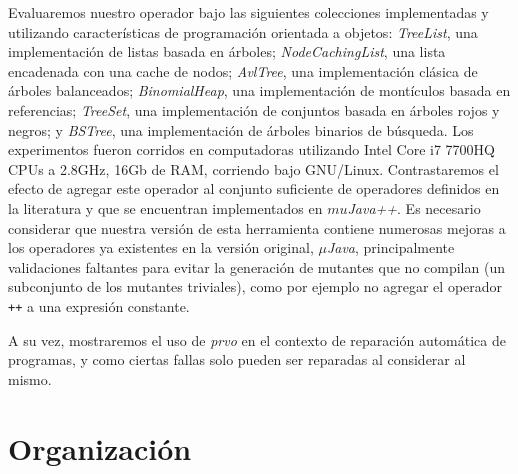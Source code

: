 Evaluaremos nuestro operador bajo las siguientes colecciones implementadas y utilizando caracter\'isticas de programaci\'on orientada a objetos: \emph{TreeList}, una implementaci\'on de listas basada en \'arboles; \emph{NodeCachingList}, una lista encadenada con una cache de nodos; \emph{AvlTree}, una implementaci\'on cl\'asica de \'arboles balanceados; \emph{BinomialHeap}, una implementaci\'on de mont\'iculos basada en referencias; \emph{TreeSet}, una implementaci\'on de conjuntos basada en \'arboles rojos y negros; y \emph{BSTree}, una implementaci\'on de \'arboles binarios de b\'usqueda. Los experimentos fueron corridos en computadoras utilizando Intel Core i7 7700HQ CPUs a 2.8GHz, 16Gb de RAM, corriendo bajo GNU/Linux. Contrastaremos el efecto de agregar este operador al conjunto suficiente de operadores definidos en la literatura y que se encuentran implementados en \emph{$mu$Java++}. Es necesario considerar que nuestra versi\'on de esta herramienta contiene numerosas mejoras a los operadores ya existentes en la versi\'on original, \emph{$\mu$Java}, principalmente validaciones faltantes para evitar la generaci\'on de mutantes que no compilan (un subconjunto de los mutantes triviales), como por ejemplo no agregar el operador \texttt{++} a una expresi\'on constante.

A su vez, mostraremos el uso de \emph{prvo} en el contexto de reparaci\'on autom\'atica de programas, y como ciertas fallas solo pueden ser reparadas al considerar al mismo.

\section{Organizaci\'on}
\label{sec:intro.organizacion}

